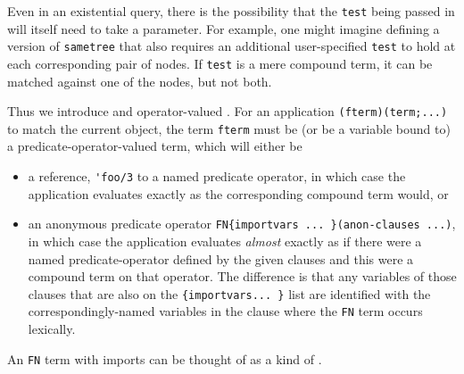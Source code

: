 Even in an existential query, there is the possibility that the \verb|test|
being passed in will itself need to take a parameter. For example, one might
imagine defining a version of \verb|sametree| that also requires an additional
user-specified \verb|test| to hold at each corresponding pair of nodes. If
\verb|test| is a mere compound term, it can be matched against one of the nodes,
but not both.

Thus we introduce  and
operator-valued . For an application
\verb|(fterm)(term;...)| to match the current object, the term \verb|fterm| must
be (or be a variable bound to) a predicate-operator-valued term, which will
either be
\begin{itemize}
  \item a reference, \verb|'foo/3| to a named predicate operator,
in which case the application evaluates exactly as the corresponding compound
term would, or
\item an anonymous predicate operator
\verb|FN{importvars ... }(anon-clauses ...)|, in which case the application
evaluates \emph{almost} exactly as if there were a named predicate-operator
defined by the given clauses and this were a compound term on that operator. The
difference is that any variables of those clauses that are also on the
\verb|{importvars... }| list are identified with the correspondingly-named
variables in the clause where the \verb|FN| term occurs lexically.
\end{itemize}

An \verb|FN| term with imports can be thought of as a kind of
.



\secup %

\secup %